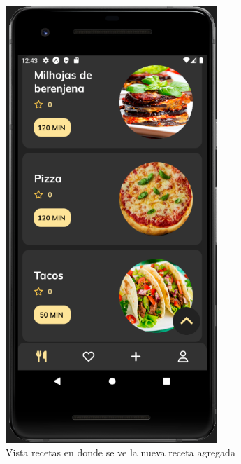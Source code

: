 \begin{figure}[!h]
  \centering
  \includegraphics[width=8cm, scale=1]{Images/Imagenes/add7.png}
  \caption{Vista recetas en donde se ve la nueva receta agregada}
  \label{fig:add7}
\end{figure}

